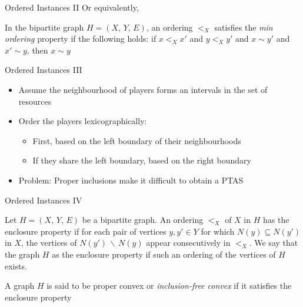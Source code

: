 \documentclass[10pt]{beamer}
\begin{document}
\begin{frame}{Ordered Instances II}
    Or equivalently, 
    \begin{definition}
    	In the bipartite graph $H = (X, \, Y, \, E)$, an ordering $<_X$ satisfies the \emph{min ordering} property if the following holds: if $x <_X x'$ and $y <_X y'$ and $x \sim y'$ and $x' \sim y$, then \alert{$x \sim y$}
    	\begin{figure}
		\end{figure}
    \end{definition}
\end{frame}

\begin{frame}{Ordered Instances III}
	\begin{itemize}
    	\item<1-> Assume the neighbourhood of players forms an intervals in the set of resources
        \item<2-> Order the players lexicographically:
       	\begin{itemize}
        	\item<3-> First, based on the \alert{left boundary} of their neighbourhoods
            \item<4-> If they share the left boundary, based on the \alert{right boundary}
        \end{itemize}
        \item<5-> \alert{Problem:} Proper inclusions make it difficult to obtain a PTAS
    \end{itemize}
\end{frame}


\begin{frame}{Ordered Instances IV}
	\begin{definition}
Let $H = (X, \, Y, \, E)$ be a bipartite graph. An ordering $<_X$ of $X$ in $H$ has the enclosure property if for each pair of vertices $y, y' \in Y$ for which $N(y) \subseteq N(y')$ in $X$, the vertices of $N(y') \, \backslash \, N(y)$ appear consecutively in $<_X$. We say that the graph $H$ as the enclosure property if such an ordering of the vertices of $H$ exists.	
	\end{definition}
    A graph $H$ is said to be \alert{proper convex} or \emph{inclusion-free convex} if it satisfies the enclosure property
\end{frame}
\end{document}
